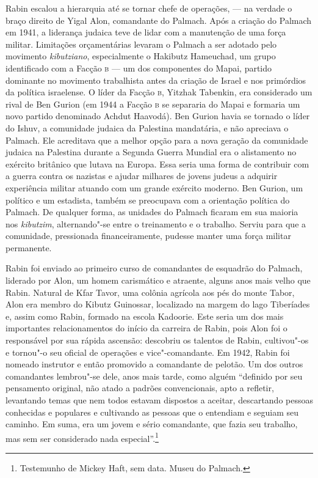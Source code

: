 Rabin escalou a hierarquia até se tornar chefe de operações, --- na
verdade o braço direito de Yigal Alon, comandante do Palmach. Após a
criação do Palmach em 1941, a liderança judaica teve de lidar com a
manutenção de uma força militar. Limitações orçamentárias
levaram o Palmach a ser adotado pelo movimento \emph{kibutziano}, especialmente
o Hakibutz Hameuchad, um grupo identificado com a Facção \textsc{b} --- um dos
componentes do Mapai, partido dominante no movimento trabalhista
antes da criação de Israel e nos primórdios da política israelense. O
líder da Facção \textsc{b}, Yitzhak Tabenkin, era considerado um rival de Ben
Gurion (em 1944 a Facção \textsc{b} se separaria do Mapai e formaria um novo
partido denominado Achdut Haavodá). Ben Gurion havia se
tornado o líder do Ishuv, a comunidade judaica da Palestina mandatária, e
não apreciava o Palmach. Ele acreditava que a melhor opção
para a nova geração da comunidade judaica na Palestina durante a Segunda
Guerra Mundial era o alistamento no exército britânico que lutava na
Europa. Essa seria uma forma de contribuir com a guerra contra os
nazistas e ajudar milhares de jovens judeus a adquirir experiência
militar atuando com um grande exército moderno. Ben Gurion, um político
e um estadista, também se preocupava com a orientação política
do Palmach. De qualquer forma, as unidades do Palmach ficaram em sua
maioria nos \emph{kibutzim}, alternando"-se entre o treinamento e o trabalho.
Serviu para que a comunidade, pressionada financeiramente, pudesse
manter uma força militar permanente.

Rabin foi enviado ao primeiro curso de comandantes de esquadrão do
Palmach, liderado por Alon, um homem carismático e atraente, alguns anos
mais velho que Rabin. Natural de Kfar Tavor, uma colônia agrícola aos
pés do monte Tabor, Alon era membro do Kibutz Guinossar, localizado na
margem do lago Tiberíades e, assim como Rabin, formado na escola
Kadoorie. Este seria um dos mais importantes relacionamentos do início
da carreira de Rabin, pois Alon foi o responsável por sua rápida
ascensão: descobriu os talentos de Rabin, cultivou"-os e tornou"-o seu
oficial de operações e vice"-comandante. Em 1942, Rabin foi nomeado
instrutor e então promovido a comandante de pelotão. Um dos outros
comandantes lembrou"-se dele, anos mais tarde, como alguém
``definido por seu pensamento original, não atado a padrões
convencionais, apto a refletir, levantando temas que nem todos estavam
dispostos a aceitar, descartando pessoas conhecidas e populares e
cultivando as pessoas que o entendiam e seguiam seu caminho. Em suma,
era um jovem e sério comandante, que fazia seu trabalho, mas sem ser
considerado nada especial''.\footnote{Testemunho de Mickey Haft, sem data. Museu do Palmach.}

